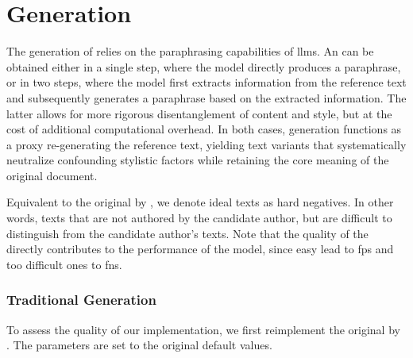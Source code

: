 \section{\imp{} Generation}
\label{sec:impostor_generation}

The generation of \imps{} relies on the paraphrasing capabilities of \acp{llm}. 
An \imp{} can be obtained either in a single step, where the model directly produces a paraphrase, or in two steps, where the model first extracts information from the reference text and subsequently generates a paraphrase based on the extracted information. 
The latter allows for more rigorous disentanglement of content and style, but at the cost of additional computational overhead. 
In both cases, \imp{} generation functions as a proxy re-generating the reference text, yielding text variants that systematically neutralize confounding stylistic factors while retaining the core meaning of the original document.

Equivalent to the original \impAppr{} by \citet{koppel_determining_2014}, we denote ideal \imp{} texts as hard negatives.
In other words, texts that are not authored by the candidate author, but are difficult to distinguish from the candidate author's texts.
Note that the quality of the \imps{} directly contributes to the performance of the model, 
since easy \imps{} lead to \acp{fp} and too difficult ones to \acp{fn}.

\subsubsection{Traditional \imp{} Generation}
\label{subsubsec:traditional_impostor_generation}

To assess the quality of our \impAppr{} implementation, we first reimplement the original \impAppr{} by \citet{koppel_determining_2014}.
The parameters are set to the original default values.


